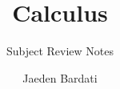 \documentclass[]{article}
\title{\Huge Calculus}
\subtitle{Subject Review Notes}
\author{Jaeden Bardati}
\date{}
\begin{document}
\maketitle


\TestCustomPackage
\end{document}

